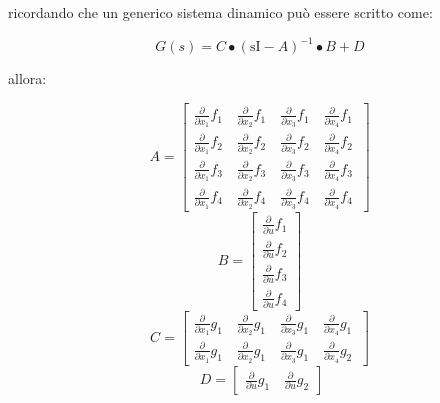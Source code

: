 ricordando che un generico sistema dinamico può essere scritto come:
\begin{center}
	$$
	G\left(s\right)=C\bullet {\left(\mathrm{sI}-A\right)}^{-1} \bullet B+D
	$$
\end{center}
allora:
\begin{center}
	$$
	A=\left\lbrack \begin{array}{cccc}
	\frac{\partial }{\partial x_1 }f_{1\;}  & \frac{\partial }{\partial x_2 }f_{1\;}  & \frac{\partial }{\partial x_3 }f_{1\;}  & \frac{\partial }{\partial x_4 }f_{1\;} \\
	\frac{\partial }{\partial x_1 }f_{2\;}  & \frac{\partial }{\partial x_2 }f_{2\;}  & \frac{\partial }{\partial x_3 }f_{2\;}  & \frac{\partial }{\partial x_4 }f_{2\;} \\
	\frac{\partial }{\partial x_1 }f_3  & \frac{\partial }{\partial x_2 }f_3  & \frac{\partial }{\partial x_3 }f_3  & \frac{\partial }{\partial x_4 }f_3 \\
	\frac{\partial }{\partial x_1 }f_4  & \frac{\partial }{\partial x_2 }f_4  & \frac{\partial }{\partial x_3 }f_4  & \frac{\partial }{\partial x_4 }f_4 
	\end{array}\right\rbrack
	$$
	$$
	B=\left\lbrack \begin{array}{c}
	\frac{\partial }{\partial u}f_1 \\
	\frac{\partial }{\partial u}f_2 \\
	\frac{\partial }{\partial u}f_3 \\
	\frac{\partial }{\partial u}f_4 
	\end{array}\right\rbrack
	$$
	$$
	C=\left\lbrack \begin{array}{cccc}
	\frac{\partial }{\partial x_1 }g_{1\;}  & \frac{\partial }{\partial x_2 }g_{1\;}  & \frac{\partial }{\partial x_3 }g_{1\;}  & \frac{\partial }{\partial x_4 }g_{1\;} \\
	\frac{\partial }{\partial x_1 }g_{1\;}  & \frac{\partial }{\partial x_2 }g_{1\;}  & \frac{\partial }{\partial x_3 }g_{1\;}  & \frac{\partial }{\partial x_4 }g_2 
	\end{array}\right\rbrack
	$$
	$$
	\;D=\left\lbrack \begin{array}{cc}
	\frac{\partial }{\partial u}g_{1\;}  & \frac{\partial }{\partial u}g_2 
	\end{array}\right\rbrack
	$$
\end{center}
